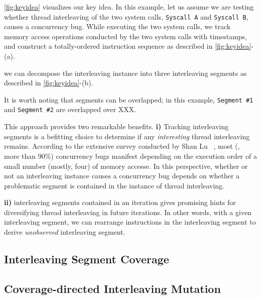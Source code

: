 \autoref{fig:keyidea} visualizes our key idea.
%
In this example, let us assume we are testing whether thread
interleaving of the two system calls, \texttt{Syscall A} and
\texttt{Syscall B}, causes a concurrency bug.
%
While executing the two system calls, we track memory access
operations conducted by the two system calls with timestamps, and
construct a totally-ordered instruction sequence as described in
\autoref{fig:keyidea}-(a).

we can decompose the interleaving instance into three interleaving
segments as described in \autoref{fig:keyidea}-(b).


It is worth noting that segments can be overlapped; in this example,
\texttt{Segment \#1} and \texttt{Segment \#2} are overlapped over XXX.





%
This approach provides two remarkable benefits.
%
\textbf{i)} Tracking interleaving segments is a befitting choice to
determine if any \textit{interesting} thread interleaving remains.
%
According to the extensive survey conducted by Shan Lu
\etal~\cite{learningfrommistakes}, most (\ie, more than 90\%)
concurrency bugs manifest depending on the execution order of a small
number (mostly, four) of memory accesse.
%
In this perspective, whether or not an interleaving instance causes a
concurrency bug depends on whether a problematic segment is contained
in the instance of thread interleaving.
%

\textbf{ii)} interleaving segments contained in an iteration gives
promising hints for diversifying thread interleaving in future
iterations.
%
In other words, with a given interleaving segment, we can rearrange
instructions in the interleaving segment to derive \textit{unobserved}
interleaving segment.



\subsection{Interleaving Segment Coverage}
\label{ss:coverage}




\subsection{Coverage-directed Interleaving Mutation}
\label{ss:scheduler}


